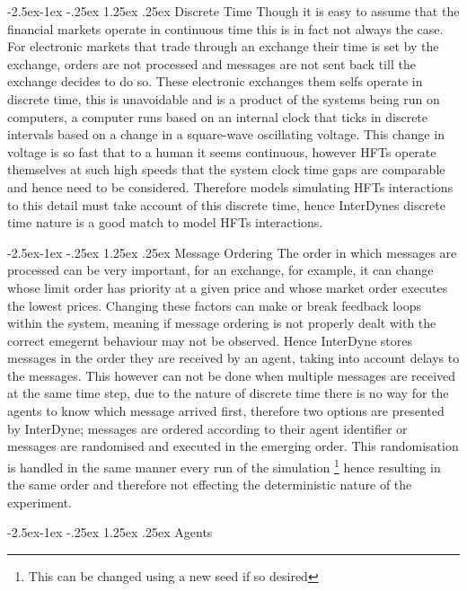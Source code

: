 \documentclass{article}
\makeatletter
\renewcommand\paragraph{\@startsection{paragraph}{4}{\z@}%
	{-2.5ex\@plus -1ex \@minus -.25ex}%
	{1.25ex \@plus .25ex}%
	{\normalfont\normalsize\bfseries}}
\makeatother
\begin{document}
\paragraph{Discrete Time}
Though it is easy to assume that the financial markets operate in continuous time this is in fact not always the case. For electronic markets that trade through an exchange their time is set by the exchange, orders are not processed and messages are not sent back till the exchange decides to do so. These electronic exchanges them selfs operate in discrete time, this is unavoidable and is a product of the systems being run on computers, a computer runs based on an internal clock that ticks in discrete intervals based on a change in a square-wave oscillating voltage. This change in voltage is so fast that to a human it seems continuous, however HFTs operate themselves at such high speeds that the system clock time gaps are comparable and hence need to be considered. Therefore models simulating HFTs interactions to this detail must take account of this discrete time, hence InterDynes discrete time nature is a good match to model HFTs interactions.     
     

\paragraph{Message Ordering}
The order in which messages are processed can be very important, for an exchange, for example, it can change whose limit order has priority at a given price and whose market order executes the lowest prices. Changing these factors can make or break feedback loops within the system, meaning if message ordering is not properly dealt with the correct emegernt behaviour may not be observed. Hence InterDyne stores messages in the order they are received by an agent, taking into account delays to the messages. This however can not be done when multiple messages are received at the same time step, due to the nature of discrete time there is no way for the agents to know which message arrived first, therefore two options are presented by InterDyne; messages are ordered according to their agent identifier %
or messages are randomised and executed in the  emerging order. This randomisation is handled in the same manner every run of the simulation \footnote{This can be changed using a new seed if so desired} hence resulting in the same order and therefore not effecting the deterministic nature of the experiment.  


\paragraph{Agents}
\end{document}
